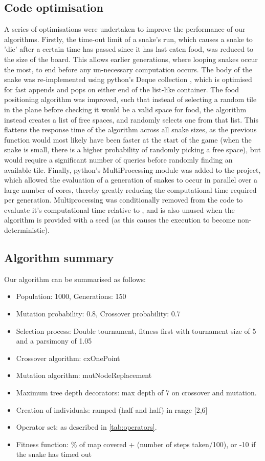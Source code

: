 \documentclass[british,10pt,a4paper]{article}
\begin{document}
\subsection{Code optimisation}
\label{subsec:code_optimisation}
A series of optimisations were undertaken to improve the performance of our algorithms. Firstly, the time-out limit of a snake's run, which causes a snake to 'die' after a certain time has passed since it has last eaten food, was reduced to the size of the board. This allows earlier generations, where looping snakes occur the most, to end before any un-necessary computation occurs. 
The body of the snake was re-implemented using python's Deque collection \cite{noauthor_undated-bi}, which is optimised for fast appends and pops on either end of the list-like container. The food positioning algorithm was improved, such that instead of selecting a random tile in the plane before checking it would be a valid space for food, the algorithm instead creates a list of free spaces, and randomly selects one from that list. This flattens the response time of the algorithm across all snake sizes, as the previous function would most likely have been faster at the start of the game (when the snake is small, there is a higher probability of randomly picking a free space), but would require a significant number of queries before randomly finding an available tile. Finally, python's MultiProcessing module was added to the project, which allowed the evaluation of a generation of snakes to occur in parallel over a large number of cores, thereby greatly reducing the computational time required per generation. Multiprocessing was conditionally removed from the code to evaluate it's computational time relative to \citet{Ehlis2000-sz}, and is also unused when the algorithm is provided with a seed (as this causes the execution to become non-deterministic).

\subsection{Algorithm summary}
\label{subsec:summary}
Our algorithm can be summarised as follows:
\begin{itemize}
	\item Population: 1000, Generations: 150
	\item Mutation probability: 0.8, Crossover probability: 0.7
	\item Selection process: Double tournament, fitness first with tournament size of 5 and a parsimony of 1.05
	\item Crossover algorithm: cxOnePoint
	\item Mutation algorithm: mutNodeReplacement
	\item Maximum tree depth decorators: max depth of 7 on crossover and mutation.
	\item Creation of individuals: ramped (half and half) in range [2,6]
	\item Operator set: as described in \autoref{tab:operators}.
	\item Fitness function: \% of map covered + (number of steps taken/100), or -10 if the snake has timed out

\end{itemize}
\end{document}
